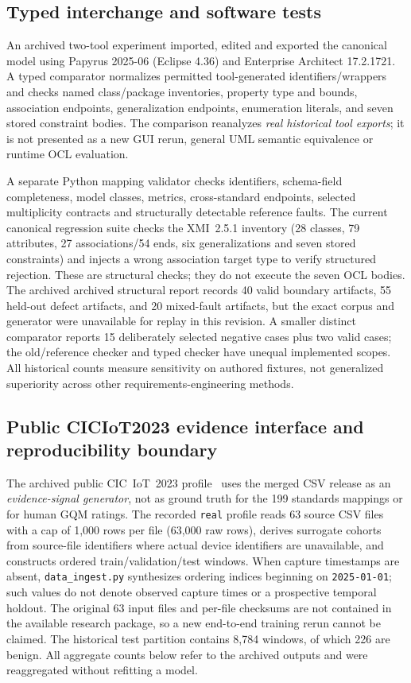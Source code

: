 \documentclass[12pt,a4paper]{article}
\begin{document}

\subsection{Typed interchange and software tests}
An archived two-tool experiment imported, edited and exported the canonical model using Papyrus 2025-06 (Eclipse 4.36) and Enterprise Architect 17.2.1721. A typed comparator normalizes permitted tool-generated identifiers/wrappers and checks named class/package inventories, property type and bounds, association endpoints, generalization endpoints, enumeration literals, and seven stored constraint bodies. The comparison reanalyzes \emph{real historical tool exports}; it is not presented as a new GUI rerun, general UML semantic equivalence or runtime OCL evaluation.

A separate Python mapping validator checks identifiers, schema-field completeness, model classes, metrics, cross-standard endpoints, selected multiplicity contracts and structurally detectable reference faults. The current canonical regression suite checks the XMI~2.5.1 inventory (28 classes, 79 attributes, 27 associations/54 ends, six generalizations and seven stored constraints) and injects a wrong association target type to verify structured rejection. These are structural checks; they do not execute the seven OCL bodies. The archived archived structural report records 40 valid boundary artifacts, 55 held-out defect artifacts, and 20 mixed-fault artifacts, but the exact corpus and generator were unavailable for replay in this revision. A smaller distinct comparator reports 15 deliberately selected negative cases plus two valid cases; the old/reference checker and typed checker have unequal implemented scopes. All historical counts measure sensitivity on authored fixtures, not generalized superiority across other requirements-engineering methods.


\subsection{Public CICIoT2023 evidence interface and reproducibility boundary}
\label{sec:telemetry-method}
The archived public CIC~IoT~2023 profile~\cite{Neto2023_CICIoT2023,CICIoT2023_Web} uses the merged CSV release as an \emph{evidence-signal generator}, not as ground truth for the 199 standards mappings or for human GQM ratings. The recorded \texttt{real} profile reads 63 source CSV files with a cap of 1,000 rows per file (63,000 raw rows), derives surrogate cohorts from source-file identifiers where actual device identifiers are unavailable, and constructs ordered train/validation/test windows. When capture timestamps are absent, \texttt{data\_ingest.py} synthesizes ordering indices beginning on \texttt{2025-01-01}; such values do not denote observed capture times or a prospective temporal holdout. The original 63 input files and per-file checksums are not contained in the available research package, so a new end-to-end training rerun cannot be claimed. The historical test partition contains 8,784 windows, of which 226 are benign. All aggregate counts below refer to the archived outputs and were reaggregated without refitting a model.
\end{document}
